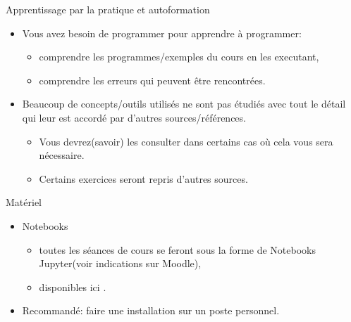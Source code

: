 \begin{frame}[allowframebreaks]{Apprentissage par la pratique et autoformation}
    \begin{itemize}
        \item Vous avez besoin de programmer pour apprendre à programmer:
        \begin{itemize}
            \item comprendre les programmes/exemples du cours en les executant,
            \item comprendre les erreurs qui peuvent être rencontrées.
        \end{itemize}
        \item Beaucoup de concepts/outils utilisés ne sont pas étudiés avec tout le détail qui leur est accordé 
        par d'autres sources/références.
        \begin{itemize}
            \item Vous devrez(savoir) les consulter dans certains cas où cela vous sera nécessaire.
            \item Certains exercices seront repris d'autres sources.
        \end{itemize}
    \end{itemize}
\end{frame}

\begin{frame}[allowframebreaks]{Matériel}
    \begin{itemize}
        \item Notebooks
        \begin{itemize}
            \item toutes les séances de cours se feront sous la forme de Notebooks Jupyter(voir indications sur Moodle),
            \item disponibles ici \url{}.
        \end{itemize} 
        \item  Recommandé: faire une installation sur un poste personnel.
    \end{itemize}
\end{frame}


